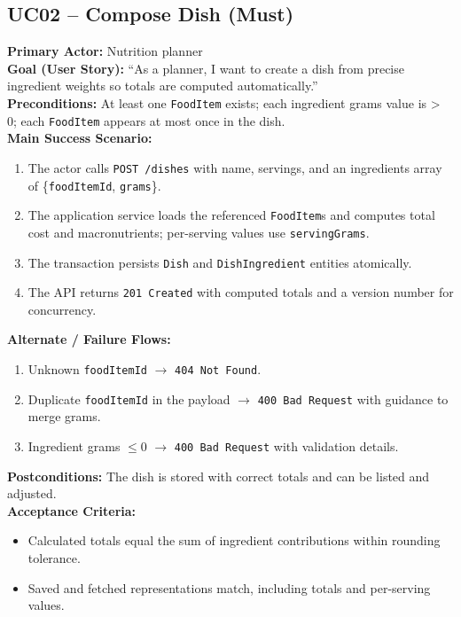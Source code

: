 \documentclass[11pt]{article}
\begin{document}
\subsection*{UC02 -- Compose Dish (Must)}
\textbf{Primary Actor:} Nutrition planner\\
\textbf{Goal (User Story):} ``As a planner, I want to create a dish from precise ingredient weights so totals are computed automatically.''\\
\textbf{Preconditions:} At least one \texttt{FoodItem} exists; each ingredient grams value is > 0; each \texttt{FoodItem} appears at most once in the dish.\\
\textbf{Main Success Scenario:}
\begin{enumerate}[label=\arabic*.]
  \item The actor calls \texttt{POST /dishes} with name, servings, and an ingredients array of \{\texttt{foodItemId}, \texttt{grams}\}.
  \item The application service loads the referenced \texttt{FoodItem}s and computes total cost and macronutrients; per-serving values use \texttt{servingGrams}.
  \item The transaction persists \texttt{Dish} and \texttt{DishIngredient} entities atomically.
  \item The API returns \texttt{201 Created} with computed totals and a version number for concurrency.
\end{enumerate}
\textbf{Alternate / Failure Flows:}
\begin{enumerate}[label=\arabic*F.]
  \item Unknown \texttt{foodItemId} $\rightarrow$ \texttt{404 Not Found}.
  \item Duplicate \texttt{foodItemId} in the payload $\rightarrow$ \texttt{400 Bad Request} with guidance to merge grams.
  \item Ingredient grams $\leq 0$ $\rightarrow$ \texttt{400 Bad Request} with validation details.
\end{enumerate}
\textbf{Postconditions:} The dish is stored with correct totals and can be listed and adjusted.\\
\textbf{Acceptance Criteria:}
\begin{itemize}[noitemsep]
  \item Calculated totals equal the sum of ingredient contributions within rounding tolerance.
  \item Saved and fetched representations match, including totals and per-serving values.
\end{itemize}
\end{document}
